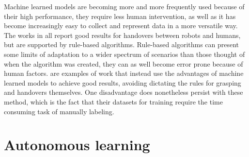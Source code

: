 Machine learned models are becoming more and more frequently used because of their high performance, they require less human intervention, as well as it has become increasingly easy to collect and represent data in a more versatile way. The works in \parencite{Aleotti2012} \parencite{Suay2015} \parencite{Kim2004} all report good results for handovers between robots and humans, but are supported by rule-based algorithms. Rule-based algorithms can present some limits of adaptation to a wider spectrum of scenarios than those thought of when the algorithm was created, they can as well become error prone because of human factors. \parencite{Redmon2014} \parencite{Lenz2015} \parencite{Jiang2011} \parencite{Huebner2008a} are examples of work that instead use the advantages of machine learned models to achieve good results, avoiding dictating the rules for grasping and handovers themselves. One disadvantage does nonetheless persist with these method, which is the fact that their datasets for training require the time consuming task of manually labeling.

\section{Autonomous learning}
